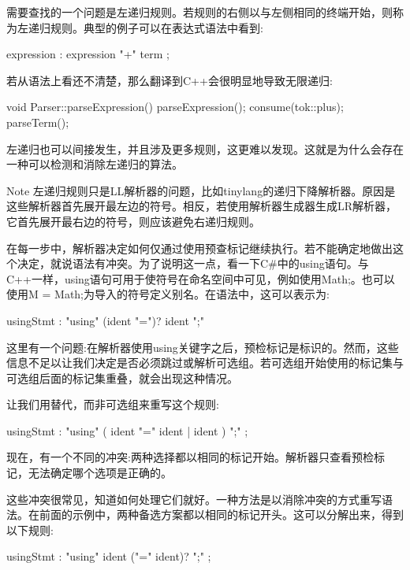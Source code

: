 需要查找的一个问题是左递归规则。若规则的右侧以与左侧相同的终端开始，则称为左递归规则。典型的例子可以在表达式语法中看到:

\begin{shell}
expression : expression "+" term ;
\end{shell}

若从语法上看还不清楚，那么翻译到C++会很明显地导致无限递归:

\begin{cpp}
void Parser::parseExpression() {
    parseExpression();
    consume(tok::plus);
    parseTerm();
}
\end{cpp}

左递归也可以间接发生，并且涉及更多规则，这更难以发现。这就是为什么会存在一种可以检测和消除左递归的算法。

\begin{myNotic}{Note}
左递归规则只是LL解析器的问题，比如tinylang的递归下降解析器。原因是这些解析器首先展开最左边的符号。相反，若使用解析器生成器生成LR解析器，它首先展开最右边的符号，则应该避免右递归规则。
\end{myNotic}

在每一步中，解析器决定如何仅通过使用预查标记继续执行。若不能确定地做出这个决定，就说语法有冲突。为了说明这一点，看一下C\#中的using语句。与C++一样，using语句可用于使符号在命名空间中可见，例如使用Math;。也可以使用M = Math;为导入的符号定义别名。在语法中，这可以表示为:

\begin{shell}
usingStmt : "using" (ident "=")? ident ";"
\end{shell}

这里有一个问题:在解析器使用using关键字之后，预检标记是标识的。然而，这些信息不足以让我们决定是否必须跳过或解析可选组。若可选组开始使用的标记集与可选组后面的标记集重叠，就会出现这种情况。

让我们用替代，而非可选组来重写这个规则:

\begin{shell}
usingStmt : "using" ( ident "=" ident | ident ) ";" ;
\end{shell}

现在，有一个不同的冲突:两种选择都以相同的标记开始。解析器只查看预检标记，无法确定哪个选项是正确的。

这些冲突很常见，知道如何处理它们就好。一种方法是以消除冲突的方式重写语法。在前面的示例中，两种备选方案都以相同的标记开头。这可以分解出来，得到以下规则:

\begin{shell}
usingStmt : "using" ident ("=" ident)? ";" ;
\end{shell}

